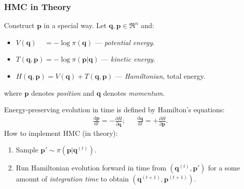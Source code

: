 \documentclass[xcolor=dvipsnames]{beamer}
\begin{document}
\begin{frame}
\frametitle{HMC in Theory}
Construct $\bm{p}$ in a special way. Let $\bm{q},\bm{p}\in \Re^n$ and:
\begin{itemize}
\item[] $V(\bm{q})\phantom{,\bm{p}} = -\log \pi(\bm{q})$ --- \emph{potential energy}.
\item[] $T(\bm{q}, \bm{p}) = - \log \pi(\bm{p} | \bm{q})$ --- \emph{kinetic energy}.
\item[] $H(\bm{q}, \bm{p}) = V(\bm{q}) + T(\bm{q}, \bm{p})$ --- \emph{Hamiltonian}, total energy. 
\end{itemize}
where $\bm{p}$ denotes \emph{position} and $\bm{q}$ denotes \emph{momentum}.

\vspace{0.3cm}

Energy-preserving evolution in time is defined by Hamilton's equations:
\begin{align*}
\frac{\mathrm{d}\bm{p}}{\mathrm{d} t} = - \frac{\partial H}{\partial \bm{q}}; && \frac{\mathrm{d}\bm{q}}{\mathrm{d} t} = + \frac{\partial H}{\partial \bm{p}}.
\end{align*}
How to implement HMC (in theory):
\begin{enumerate}
\item Sample $\bm{p}' \sim \pi(\bm{p}|\bm{q}^{(t)})$.
\item Run Hamiltonian evolution forward in time from $(\bm{q}^{(t)}, \bm{p}')$ for a some amount of \emph{integration time} to obtain $(\bm{q}^{(t+1)}, \bm{p}^{(t+1)})$.
\end{enumerate}
\end{frame}
\end{document}
